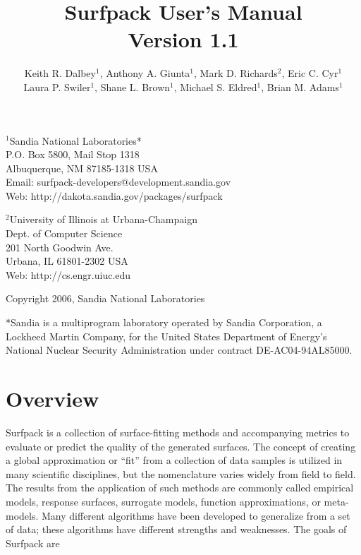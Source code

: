 \documentclass{article}
\begin{document}
\title{Surfpack User's Manual \\ Version 1.1}

\author{Keith R. Dalbey$^1$, Anthony A. Giunta$^1$, Mark D. Richards$^2$, Eric C. Cyr$^1$ \\Laura P. Swiler$^1$, Shane L. Brown$^1$, Michael S. Eldred$^1$, Brian M. Adams$^1$}

\maketitle


\begin{center}
$^1$Sandia National Laboratories*\\P.O. Box 5800, Mail Stop 1318\\Albuquerque, NM 87185-1318 USA \\
Email: surfpack-developers@development.sandia.gov \\ Web: http://dakota.sandia.gov/packages/surfpack
\end{center}

\bigbreak

\begin{center}
$^2$University of Illinois at Urbana-Champaign\\Dept. of Computer Science\\201 North Goodwin Ave.\\Urbana, IL 61801-2302 USA\\
Web: http://cs.engr.uiuc.edu
\end{center}

\bigbreak

\begin{center}
Copyright 2006, Sandia National Laboratories
\end{center}

\bigbreak

\begin{center}
*Sandia is a multiprogram laboratory operated by Sandia Corporation, a Lockheed Martin Company, 
for the United States Department of Energy's National Nuclear Security Administration under 
contract DE-AC04-94AL85000.
\end{center}

\pagebreak

\section {Overview}\label{sec:overview}
Surfpack is a collection of surface-fitting methods and accompanying metrics to evaluate or predict the quality of the generated surfaces.  The concept of creating a global approximation or ``fit'' from a collection of data samples is utilized in many scientific disciplines, but the nomenclature varies widely from field to field.  The results from the application of such methods are commonly called empirical models, response surfaces, surrogate models, function approximations, or meta-models.  Many different algorithms have been developed to generalize from a set of data; these algorithms have different strengths and weaknesses.  The goals of Surfpack are
\end{document}

